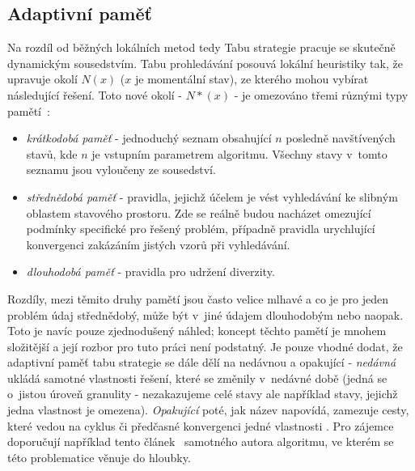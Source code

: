 \subsection{Adaptivní paměť}
Na rozdíl od běžných lokálních metod tedy Tabu strategie pracuje se skutečně dynamickým sousedstvím. Tabu prohledávání posouvá lokální heuristiky tak, že upravuje okolí $N(x)$ ($x$ je momentální stav), ze kterého mohou vybírat následující řešení. Toto nové okolí - $N*(x)$ - je omezováno třemi různými typy pamětí~\cite{gloverArt}: 
\begin{itemize}
    \item \textit{krátkodobá paměť} - jednoduchý seznam obsahující $n$ posledně navštívených stavů, kde $n$ je vstupním parametrem algoritmu. Všechny stavy v~tomto seznamu jsou vyloučeny ze sousedství.
    \item \textit{střednědobá paměť} - pravidla, jejichž účelem je vést vyhledávání ke slibným oblastem stavového prostoru. Zde se reálně budou nacházet omezující podmínky specifické pro řešený problém, případně pravidla urychlující konvergenci zakázáním jistých vzorů při vyhledávání.
    \item \textit{dlouhodobá paměť} - pravidla pro udržení diverzity.
\end{itemize}
Rozdíly, mezi těmito druhy pamětí jsou často velice mlhavé a co je pro jeden problém údaj střednědobý, může být v~jiné údajem dlouhodobým nebo naopak. Toto je navíc pouze zjednodušený náhled; koncept těchto pamětí je mnohem složitější a její rozbor pro tuto práci není podstatný. Je pouze vhodné dodat, že adaptivní paměť tabu strategie se dále dělí na nedávnou a opakující  -
\textit{nedávná} ukládá samotné vlastnosti řešení, které se změnily v~nedávné době (jedná se o~jistou úroveň granulity - nezakazujeme celé stavy ale například stavy, jejichž jedna vlastnost je omezena). \textit{Opakující} poté, jak název napovídá, zamezuje cesty, které vedou na cyklus či předčasné konvergenci jedné vlastnosti .
Pro zájemce doporučují například tento článek~\cite{gloverArt} samotného autora algoritmu, ve kterém se této problematice věnuje do hloubky.

